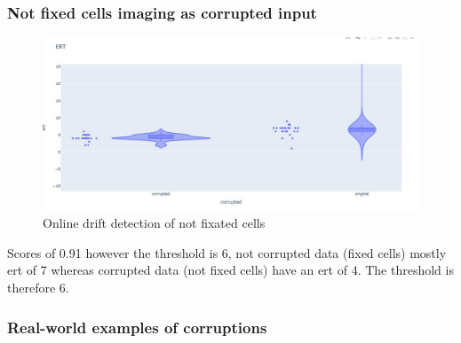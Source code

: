 \subsubsection{Not fixed cells imaging as corrupted input}
    \begin{figure}[H]
        \begin{center}
            \includegraphics[width=0.5\linewidth]{bilder/drift-detection/online-fixed-vs-not-fixed.jpg}
            \caption{Online drift detection of not fixated cells}\label{fig:online-drift-not-fixed}
        \end{center}
    \end{figure}

    Scores of 0.91 however the threshold is 6, not corrupted data (fixed cells) mostly ert of 7 whereas corrupted data (not fixed cells) have an ert of 4. The threshold is therefore 6.

\subsubsection{Real-world examples of corruptions}
